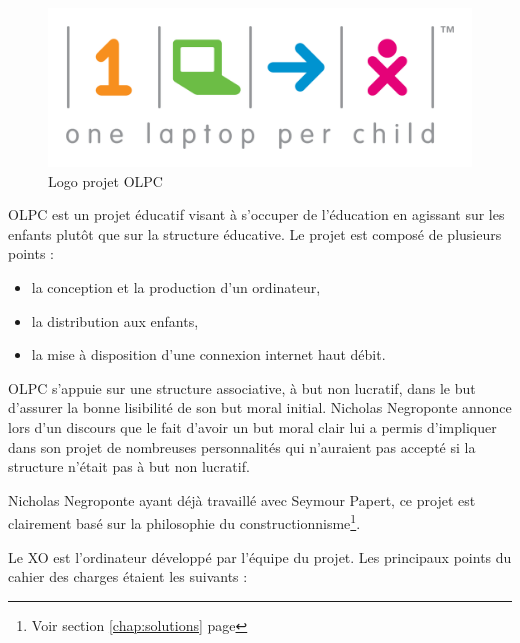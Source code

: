 \begin{figure}[H]
  \centering
  \includegraphics[width=.5\textwidth]{../resources/illustrations/OLPC_logo}
  \caption{Logo projet \gls{OLPC}}
\end{figure}

\gls{OLPC} est un projet éducatif visant à s'occuper de l'éducation en agissant sur les enfants plutôt que sur la structure éducative. Le projet est composé de plusieurs points : 



\begin{itemize}
  \item la conception et la production d'un ordinateur,
  \item la distribution aux enfants,
  \item la mise à disposition d'une connexion internet haut débit.
\end{itemize}

\gls{OLPC} s'appuie sur une structure associative, à but non lucratif, dans le but d'assurer la bonne lisibilité de son but moral initial. Nicholas Negroponte annonce lors d'un discours \cite{ted_olpc_2008} que le fait d'avoir un but moral clair lui a permis d'impliquer dans son projet de nombreuses personnalités qui n'auraient pas accepté si la structure n'était pas à but non lucratif.

Nicholas Negroponte ayant déjà travaillé avec Seymour Papert, ce projet est clairement basé sur la philosophie du constructionnisme\footnote{Voir section \ref{chap:solutions} page \pageref{chap:solutions}}.

Le XO est l'ordinateur développé par l'équipe du projet. Les principaux points du cahier des charges étaient les suivants : 

